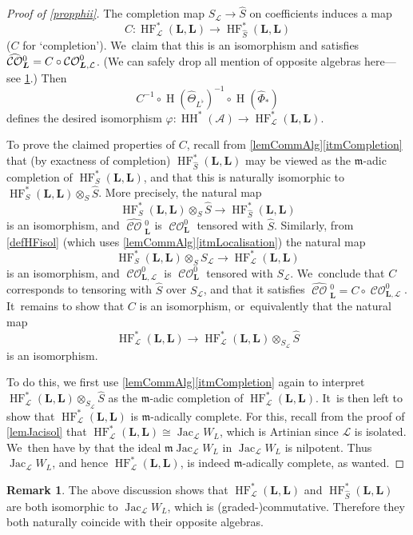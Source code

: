 \documentclass[JEP,XML,SOM,Unicode,NoEqCountersInSection,NoFloatCountersInSection,published]{cedram}
\theoremstyle{definition}
\newtheorem{remark}[theorem]{Remark}
\let\phi\varphi
\newcommand{\LL}{L^\flat}
\newcommand{\hatS}{\widehat{S}}
\newcommand{\hatCO}{\widehat{\CO}{}^0_\bL}
\newcommand{\hatPhi}{\widehat{\Phi}}
\newcommand{\hatTheta}{\widehat{\Theta}_{\LL}}
\newcommand{\calA}{\mathcal{A}}
\newcommand{\calL}{\mathcal{L}}
\newcommand{\bL}{{\boldsymbol{L}}}
\newcommand{\m}{\mathfrak{m}}
\newcommand{\rH}{\operatorname{H}}
\newcommand{\HH}{\operatorname{HH}}
\newcommand{\HF}{\operatorname{HF}}
\newcommand{\CO}{\operatorname{\mathcal{CO}}}
\newcommand{\Jac}{\operatorname{Jac}}
\begin{document}
\begin{proof}[Proof of \cref{propphii}]
The completion map $S_\calL \to \hatS$ on coefficients induces a map
\[
C : \HF^*_\calL(\bL, \bL) \to \HF^*_{\hatS}(\bL, \bL)
\]
($C$ for `completion'). We~claim that this is an isomorphism and satisfies $\hatCO = C \circ\nobreak \CO^0_{\bL, \calL}$. (We can safely drop all mention of opposite algebras here---see \cref{rmkDropOpposite}.) Then
\[
C^{-1} \circ \rH(\hatTheta)^{-1} \circ \rH(\hatPhi_*)
\]
defines the desired isomorphism $\phi : \HH^*(\calA) \to \HF^*_\calL(\bL, \bL)$.

To prove the claimed properties of $C$, recall from \cref{lemCommAlg}\eqref{itmCompletion} that (by exactness of completion) $\HF^*_{\hatS}(\bL, \bL)$ may be viewed as the $\m$-adic completion of $\HF^*_S(\bL, \bL)$, and that this is naturally isomorphic to $\HF^*_S(\bL, \bL) \otimes_S \hatS$. More precisely, the natural map
\[
\HF^*_S(\bL, \bL) \otimes_S \hatS \to \HF^*_{\hatS}(\bL, \bL)
\]
is an isomorphism, and $\hatCO$ is $\CO^0_\bL$ tensored with $\hatS$. Similarly, from \cref{defHFisol} (which uses \cref{lemCommAlg}\eqref{itmLocalisation}) the natural map
\[
\HF^*_S(\bL, \bL) \otimes_S S_\calL \to \HF^*_\calL(\bL, \bL)
\]
is an isomorphism, and $\CO^0_{\bL, \calL}$ is $\CO^0_\bL$ tensored with $S_\calL$. We~conclude that $C$ corresponds to tensoring with $\hatS$ over $S_\calL$, and that it satisfies $\hatCO = C \circ \CO^0_{\bL, \calL}$. It~remains to show that $C$ is an isomorphism, or~equivalently that the natural map
\[
\HF^*_\calL(\bL, \bL) \to \HF^*_\calL(\bL, \bL) \otimes_{S_\calL} \hatS
\]
is an isomorphism.

To do this, we first use \cref{lemCommAlg}\eqref{itmCompletion} again to interpret $\HF^*_\calL(\bL, \bL) \otimes_{S_\calL} \hatS$ as the $\m$-adic completion of $\HF^*_\calL(\bL, \bL)$. It~is then left to show that $\HF^*_\calL(\bL, \bL)$ is $\m$-adically complete. For this, recall from the proof of \cref{lemJacisol} that $\HF^*_\calL(\bL, \bL) \cong \Jac_\calL W_L$, which is Artinian since $\calL$ is isolated. We~then have by \cite[Prop.\,8.6]{AtiyahMacdonald} that the ideal $\m \Jac_\calL W_L$ in $\Jac_\calL W_L$ is nilpotent. Thus $\Jac_\calL W_L$, and hence $\HF^*_\calL(\bL, \bL)$, is indeed $\m$-adically complete, as wanted.
\end{proof}

\begin{remark}
\label{rmkDropOpposite}
The above discussion shows that $\HF^*_\calL(\bL, \bL)$ and $\HF^*_{\hatS}(\bL, \bL)$ are both isomorphic to $\Jac_\calL W_L$, which is (graded-)commutative. Therefore they both naturally coincide with their opposite algebras.
\end{remark}
\end{document}
